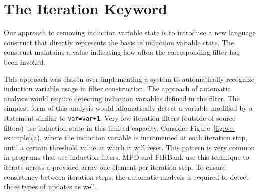 \section{The Iteration Keyword}
\label{sec:iteration}

Our approach to removing induction variable state is to introduce a
new language construct that directly represents the basis of induction
variable state. The construct maintains a value indicating how often
the corresponding filter has been invoked. 

This approach was chosen over implementing a system to automatically
recognize induction variable usage in filter construction. The
approach of automatic analysis would require detecting induction
variables defined in the filter. The simplest form of this analysis
would idiomatically detect a variable modified by a statement similar
to \texttt{var=var+1}. Very few iteration filters (outside of source
filters) use induction state in this limited capacity. Consider
Figure~\ref{fig:wc-example}(a), where the induction variable is
incremented at each iteration step, until a certain threshold value at
which it will reset. This pattern is very common in programs that use
induction filters. MPD and FIRBank use this technique to iterate
across a provided array one element per iteration step. To ensure
consistency between iteration steps, the automatic analysis is
required to detect these types of updates as well.







